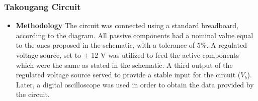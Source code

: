 \subsubsection{Takougang Circuit}
\begin{itemize}
    \item \textbf{Methodology} The circuit was connected using a standard breadboard, according to the diagram. All passive components had a nominal value equal to the ones proposed in the schematic, with a tolerance of 5\%. A regulated voltage source, set to $\pm$ 12 V was utilized to feed the active components which were the same as stated in the schematic. A third output of the regulated voltage source served to provide a stable input for the circuit ($V_b$). Later, a digital oscilloscope was used in order to obtain the data provided by the circuit.


\end{itemize}
